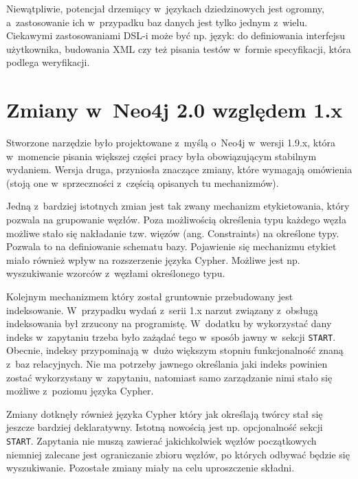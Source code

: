 \documentclass[brudnopis]{xmgr}
\begin{document}
Niewątpliwie, potencjał drzemiący w~językach dziedzinowych jest ogromny, a~zastosowanie ich w~przypadku baz danych jest tylko jednym z~wielu. Ciekawymi zastosowaniami DSL-i może być np. język: do definiowania interfejsu użytkownika, budowania XML czy też pisania testów w~formie specyfikacji, która podlega weryfikacji.

\appendix
\chapter{Zmiany w~Neo4j 2.0 względem 1.x}

Stworzone narzędzie było projektowane z~myślą o~Neo4j w~wersji 1.9.x, która w~momencie pisania większej części pracy była obowiązującym stabilnym wydaniem. Wersja druga, przyniosła znaczące zmiany, które wymagają omówienia (stoją one w~sprzeczności z~częścią opisanych tu mechanizmów).

Jedną z~bardziej istotnych zmian jest tak zwany mechanizm etykietowania, który pozwala na grupowanie węzłów. Poza możliwością określenia typu każdego węzła możliwe stało się nakładanie tzw. więzów (ang. Constraints) na określone typy. Pozwala to na definiowanie schematu bazy. Pojawienie się mechanizmu etykiet miało również wpływ na rozszerzenie języka Cypher. Możliwe jest np. wyszukiwanie wzorców z~węzłami określonego typu.

Kolejnym mechanizmem który został gruntownie przebudowany jest indeksowanie. W~przypadku wydań z~serii 1.x narzut związany z~obsługą indeksowania był zrzucony na programistę. W~dodatku by wykorzystać dany indeks w~zapytaniu trzeba było zażądać tego w~sposób jawny w~sekcji \texttt{START}. Obecnie, indeksy przypominają w~dużo większym stopniu funkcjonalność znaną z~baz relacyjnych. Nie ma potrzeby jawnego określania jaki indeks powinien zostać wykorzystany w~zapytaniu, natomiast samo zarządzanie nimi stało się możliwe z~poziomu języka Cypher.

Zmiany dotknęły również języka Cypher który jak określają twórcy stał się jeszcze bardziej deklaratywny. Istotną nowością jest np. opcjonalność sekcji \texttt{START}. Zapytania nie muszą zawierać jakichkolwiek węzłów początkowych niemniej zalecane jest ograniczanie zbioru węzłów, po których odbywać będzie się wyszukiwanie. Pozostałe zmiany miały na celu uproszczenie składni.

\nocite{*}



\listoftables

\listoffigures

\oswiadczenie
\end{document}
